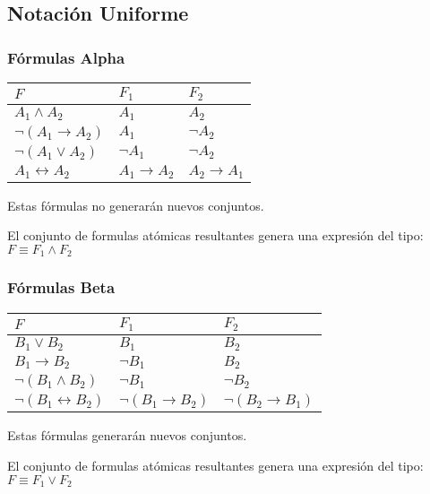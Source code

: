 \subsection{Notación Uniforme}
\subsubsection{Fórmulas Alpha}
\begin{table}[h]
        \begin{tabular}{|l|l|l|}
                \hline
                \(F\)                         & \(F_1\)                  & \(F_2\)                 \\ \hline
                \(A_1 \land  A_2\)            & \(A_1\)                  & \(A_2\)                 \\ \hline
                \(\neg(A_1 \rightarrow A_2)\) & \(A_1\)                  & \(\neg A_2\)            \\ \hline
                \(\neg(A_1 \lor A_2)\)        & \(\neg A_1\)             & \(\neg A_2\)            \\ \hline
                \(A_1 \leftrightarrow A_2\)   & \(A_1 \rightarrow  A_2\) & \(A_2 \rightarrow A_1\) \\ \hline
        \end{tabular}
\end{table}
\noindent Estas fórmulas no generarán nuevos conjuntos.
\par \noindent El conjunto de formulas atómicas resultantes genera una expresión del tipo: \(F \equiv F_1 \land F_2\)
\subsubsection{Fórmulas Beta}
\begin{table}[h]
        \begin{tabular}{|l|l|l|}
                \hline
                \(F\)                             & \(F_1\)                        & \(F_2\)                       \\ \hline
                \(B_1 \lor  B_2\)                 & \(B_1\)                        & \(B_2\)                       \\ \hline
                \(B_1 \rightarrow B_2\)           & \(\neg B_1\)                   & \( B_2\)                      \\ \hline
                \(\neg(B_1 \land B_2)\)           & \(\neg B_1\)                   & \(\neg B_2\)                  \\ \hline
                \(\neg(B_1 \leftrightarrow B_2)\) & \(\neg(B_1 \rightarrow  B_2)\) & \(\neg(B_2 \rightarrow B_1)\) \\ \hline
        \end{tabular}
\end{table}
\noindent Estas fórmulas generarán nuevos conjuntos.
\par \noindent El conjunto de formulas atómicas resultantes genera una expresión del tipo: \(F \equiv F_1 \lor F_2\)

